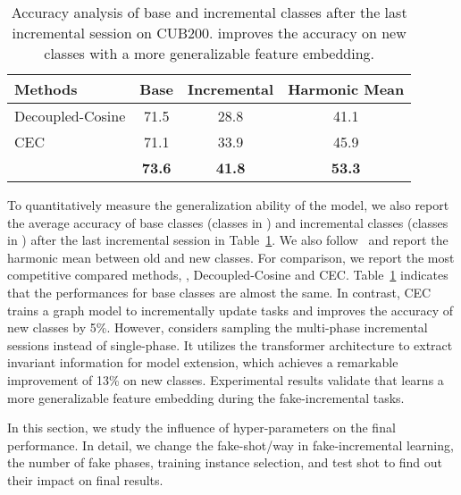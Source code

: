 \begin{table}[t] 
	\caption{Accuracy analysis of base and incremental classes after the last incremental session on CUB200. \name improves the accuracy on new classes with a more generalizable feature embedding. }
	\centering
	{\begin{tabular}{lccc}
			\addlinespace
			\toprule
			{Methods} &{Base}  &{Incremental} &{Harmonic Mean}  \\
			\midrule
			Decoupled-Cosine & 71.5 &  28.8 &41.1\\
			CEC & 71.1 & 33.9 &45.9 \\
			\midrule
			\name & \bf 73.6 & \bf41.8 &\bf 53.3\\
			\bottomrule
		\end{tabular}\label{table:knownandunknown}}
\end{table}

To quantitatively measure the generalization ability of the model, we also report the average accuracy of base classes (classes in ) and incremental classes (classes in ) after the last incremental session in Table~\ref{table:knownandunknown}.
We also follow~\cite{Cheraghian_2021_CVPR,ye2021learning} and report the harmonic mean between old and new classes.
 For comparison, we report the most competitive compared methods, \ie, Decoupled-Cosine and CEC. Table~\ref{table:knownandunknown} indicates that the performances for base classes are almost the same.
In contrast, CEC trains a graph model to incrementally update tasks and improves the accuracy of new classes by 5\%. However, \name considers sampling the multi-phase incremental sessions instead of single-phase. It utilizes the transformer architecture to extract invariant information for model extension, which achieves a remarkable improvement of 13\% on new classes.
Experimental results validate that \name learns a more generalizable feature embedding during the fake-incremental tasks.




 \label{sec:hyperparam}
In this section, we study the influence of hyper-parameters on the final performance. 
In detail, we change the fake-shot/way in  fake-incremental learning, the number of fake phases, training instance selection, and test shot to find out their impact on final results.

